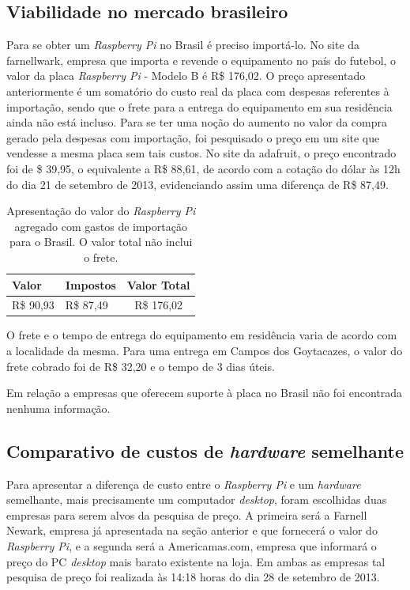 \subsection{Viabilidade no mercado brasileiro}

Para se obter um \textit{Raspberry Pi} no Brasil é preciso importá-lo. No site da farnellwark, empresa que importa e revende o equipamento no país do futebol, o valor da placa \textit{Raspberry Pi} - Modelo B é R\$ 176,02. O preço apresentado anteriormente é um somatório do custo real da placa com despesas referentes à importação, sendo que o frete para a entrega do equipamento em sua residência ainda não está incluso. Para se ter uma noção do aumento no valor da compra gerado pela despesas com importação, foi pesquisado o preço em um site que vendesse a mesma placa sem tais custos. No site da adafruit, o preço encontrado foi de \$ 39,95, o equivalente a R\$ 88,61, de acordo com a cotação do dólar às 12h do dia 21 de setembro de 2013, evidenciando assim uma diferença de R\$ 87,49.

\begin{table}[!htpb]
 \centering
    \begin{tabular}{|l|p{3cm}|c|} 
    \hline
        \textbf{Valor} & \textbf{Impostos} & \textbf{Valor Total} \\
    \hline
        R\$ 90,93 & R\$ 87,49 & R\$ 176,02 \\
    \hline
    \end{tabular}
    \caption{Apresentação do valor do \textit{Raspberry Pi} agregado com gastos de importação para o Brasil. O valor total não inclui o frete.}
    \label{t_fixa}
\end{table}

O frete e o tempo de entrega do equipamento em residência varia de acordo com a localidade da mesma. Para uma entrega em Campos dos Goytacazes, o valor do frete cobrado foi de R\$ 32,20 e o tempo de 3 dias úteis.

Em relação a empresas que oferecem suporte à placa no Brasil não foi encontrada nenhuma informação.

\subsection{Comparativo de custos de \textit{hardware} semelhante}

Para apresentar a diferença de custo entre o \textit{Raspberry Pi} e um \textit{hardware} semelhante, mais precisamente um computador \textit{desktop}, foram escolhidas duas empresas para serem alvos da pesquisa de preço. A primeira será a Farnell Newark, empresa já apresentada na seção anterior e que fornecerá o valor do \textit{Raspberry Pi}, e a segunda será a Americamas.com, empresa que informará o preço do PC \textit{desktop} mais barato existente na loja. Em ambas as empresas tal pesquisa de preço foi realizada às 14:18 horas do dia 28 de setembro de 2013.

